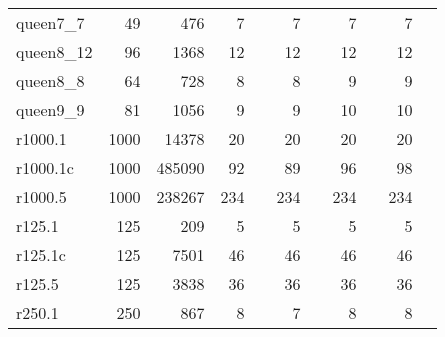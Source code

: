 \begin{table}[t]
\begin{tabular}{lrrrlrlrlrl}
  queen7\_7 & 49 & 476 & 7 & \cite{Malaguti2011,Gualandi2012} & 7 & \cite{Gualandi2012} & 7 & \cite{Mehrotra1996,Mehrotra1996,Gualandi2012} & 7 & \cite{Mehrotra1996,Mehrotra1996,Wu2013a,Gualandi2012,Zhou2016} \\ 
  queen8\_12 & 96 & 1368 & 12 & \cite{Malaguti2011,Gualandi2012} & 12 & \cite{Gualandi2012} & 12 & \cite{Mehrotra1996,Mehrotra1996,Gualandi2012,Mendez-Diaz2006,Malaguti2011,Brelaz1979,Sewell1996,Segundo2012} & 12 & \cite{Mehrotra1996,Mehrotra1996,Malaguti2011,Gualandi2012,Mendez-Diaz2006,Brelaz1979,Sewell1996,Segundo2012,Zhou2016} \\ 
  queen8\_8 & 64 & 728 & 8 & \cite{Malaguti2011,Gualandi2012} & 8 & \cite{Gualandi2012} & 9 & \cite{Mehrotra1996,Gualandi2012,Malaguti2011,Mendez-Diaz2006} & 9 & \cite{Mehrotra1996,Malaguti2011,Wu2013a,Gualandi2012,Brelaz1979,Sewell1996,Segundo2012,Zhou2016} \\ 
  queen9\_9 & 81 & 1056 & 9 & \cite{Malaguti2011,Gualandi2012} & 9 & \cite{Gualandi2012} & 10 & \cite{Mehrotra1996,Malaguti2011,Gualandi2012} & 10 & \cite{Mehrotra1996,Malaguti2011,Gualandi2012,Brelaz1979,Sewell1996,Segundo2012,Zhou2016} \\ 
  r1000.1 & 1000 & 14378 & 20 & \cite{Gualandi2012} & 20 & \cite{Gualandi2012} & 20 & \cite{Malaguti2010,Gualandi2012} & 20 & \cite{Morgenstern1996,FunabikiNobuoandHigashino2000,Malaguti2008,Zhou2018,Gualandi2012} \\ 
  r1000.1c & 1000 & 485090 & 92 & \cite{us} & 89 & \cite{Held2011} & 96 & \cite{Held2011,Gualandi2012} & 98 & \cite{Morgenstern1996,FunabikiNobuoandHigashino2000,Malaguti2008,Gualandi2012,Porumbel2010,Lu2010,Titiloye2011,Moalic2015} \\ 
  r1000.5 & 1000 & 238267 & 234 & \cite{us} & 234 & \cite{us} & 234 & \cite{Malaguti2010,Gualandi2012} & 234 & \cite{Malaguti2008,Gualandi2012} \\ 
  r125.1 & 125 & 209 & 5 & \cite{Gualandi2012} & 5 & \cite{Gualandi2012} & 5 & \cite{Gualandi2012} & 5 & \cite{Zhou2016,Gualandi2012,Zhou2018} \\ 
  r125.1c & 125 & 7501 & 46 & \cite{Gualandi2012} & 46 & \cite{Gualandi2012} & 46 & \cite{Gualandi2012} & 46 & \cite{Zhou2016,Gualandi2012,Zhou2018} \\ 
  r125.5 & 125 & 3838 & 36 & \cite{Gualandi2012} & 36 & \cite{Gualandi2012} & 36 & \cite{Gualandi2012} & 36 & \cite{Gualandi2012} \\ 
  r250.1 & 250 & 867 & 8 & \cite{us} & 7 & \cite{Gualandi2012} & 8 & \cite{Malaguti2010,Gualandi2012} & 8 & \cite{Zhou2016,Morgenstern1996,FunabikiNobuoandHigashino2000,Malaguti2008,Zhou2018,Gualandi2012} \\ 

\end{tabular}
\end{table}
